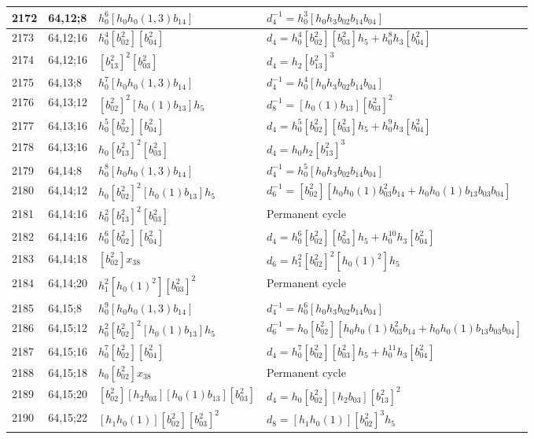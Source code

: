 \documentclass{article}
\begin{document}
\begin{longtable}{|l|l|>{\raggedright\arraybackslash}p{6cm}|>{\raggedright\arraybackslash}p{6cm}|}
\hline
2172 & 64,12;8 & $h_0^6[h_0h_0(1, 3)b_{14}]$ & $d_{4}^{-1}=h_0^3[h_0h_3b_{02}b_{14}b_{04}]$\\
\hline
2173 & 64,12;16 & $h_0^4[b_{02}^2][b_{04}^2]$ &$d_{4}=h_0^4[b_{02}^2][b_{03}^2]h_5 + h_0^8h_3[b_{04}^2]$\\
2174 & 64,12;16 & $[b_{13}^2]^2[b_{03}^2]$ &$d_{4}=h_2[b_{13}^2]^3$\\
\hline
2175 & 64,13;8 & $h_0^7[h_0h_0(1, 3)b_{14}]$ & $d_{4}^{-1}=h_0^4[h_0h_3b_{02}b_{14}b_{04}]$\\
\hline
2176 & 64,13;12 & $[b_{02}^2]^2[h_0(1)b_{13}]h_5$ & $d_{8}^{-1}=[h_0(1)b_{13}][b_{03}^2]^2$\\
\hline
2177 & 64,13;16 & $h_0^5[b_{02}^2][b_{04}^2]$ &$d_{4}=h_0^5[b_{02}^2][b_{03}^2]h_5 + h_0^9h_3[b_{04}^2]$\\
2178 & 64,13;16 & $h_0[b_{13}^2]^2[b_{03}^2]$ &$d_{4}=h_0h_2[b_{13}^2]^3$\\
\hline
2179 & 64,14;8 & $h_0^8[h_0h_0(1, 3)b_{14}]$ & $d_{4}^{-1}=h_0^5[h_0h_3b_{02}b_{14}b_{04}]$\\
\hline
2180 & 64,14;12 & $h_0[b_{02}^2]^2[h_0(1)b_{13}]h_5$ & $d_{6}^{-1}=[b_{02}^2][h_0h_0(1)b_{03}^2b_{14} + h_0h_0(1)b_{13}b_{03}b_{04}]$\\
\hline
2181 & 64,14;16 & $h_0^2[b_{13}^2]^2[b_{03}^2]$ & Permanent cycle\\
2182 & 64,14;16 & $h_0^6[b_{02}^2][b_{04}^2]$ &$d_{4}=h_0^6[b_{02}^2][b_{03}^2]h_5 + h_0^{10}h_3[b_{04}^2]$\\
\hline
2183 & 64,14;18 & $[b_{02}^2]x_{38}$ &$d_{6}=h_1^2[b_{02}^2]^2[h_0(1)^2]h_5$\\
\hline
2184 & 64,14;20 & $h_1^2[h_0(1)^2][b_{03}^2]^2$ & Permanent cycle\\
\hline
2185 & 64,15;8 & $h_0^9[h_0h_0(1, 3)b_{14}]$ & $d_{4}^{-1}=h_0^6[h_0h_3b_{02}b_{14}b_{04}]$\\
\hline
2186 & 64,15;12 & $h_0^2[b_{02}^2]^2[h_0(1)b_{13}]h_5$ & $d_{6}^{-1}=h_0[b_{02}^2][h_0h_0(1)b_{03}^2b_{14} + h_0h_0(1)b_{13}b_{03}b_{04}]$\\
\hline
2187 & 64,15;16 & $h_0^7[b_{02}^2][b_{04}^2]$ &$d_{4}=h_0^7[b_{02}^2][b_{03}^2]h_5 + h_0^{11}h_3[b_{04}^2]$\\
\hline
2188 & 64,15;18 & $h_0[b_{02}^2]x_{38}$ & Permanent cycle\\
\hline
2189 & 64,15;20 & $[b_{02}^2][h_2b_{03}][h_0(1)b_{13}][b_{03}^2]$ &$d_{4}=h_0[b_{02}^2][h_2b_{03}][b_{13}^2]^2$\\
\hline
2190 & 64,15;22 & $[h_1h_0(1)][b_{02}^2][b_{03}^2]^2$ &$d_{8}=[h_1h_0(1)][b_{02}^2]^3h_5$\\

\end{longtable}
\end{document}
